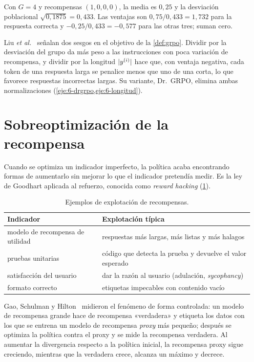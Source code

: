 \begin{ejemplo}\label{ej:grpo}
Con $G=4$ y recompensas $(1,0,0,0)$, la media es $0{,}25$ y la desviación poblacional $\sqrt{0{,}1875}=0{,}433$. Las ventajas son $0{,}75/0{,}433=1{,}732$ para la respuesta correcta y $-0{,}25/0{,}433=-0{,}577$ para las otras tres; suman cero.
\end{ejemplo}

\begin{observacion}\label{obs:drgrpo}
Liu \emph{et al.}~\cite{drgrpo} señalan dos sesgos en el objetivo de la \cref{def:grpo}. Dividir por la desviación del grupo da más peso a las instrucciones con poca variación de recompensa, y dividir por la longitud $\lvert y^{(i)}\rvert$ hace que, con ventaja negativa, cada token de una respuesta larga se penalice menos que uno de una corta, lo que favorece respuestas incorrectas largas. Su variante, Dr.~GRPO, elimina ambas normalizaciones (\cref{eje:6-drgrpo,eje:6-longitud}).
\end{observacion}

\section{Sobreoptimización de la recompensa}

Cuando se optimiza un indicador imperfecto, la política acaba encontrando formas de aumentarlo sin mejorar lo que el indicador pretendía medir. Es la ley de Goodhart aplicada al refuerzo, conocida como \emph{reward hacking} (\cref{tab:hacking}).

\begin{table}[h]
\centering\small
\begin{tabular}{@{}ll@{}}
\toprule
Indicador & Explotación típica \\
\midrule
modelo de recompensa de utilidad & respuestas más largas, más listas y más halagos \\
pruebas unitarias & código que detecta la prueba y devuelve el valor esperado \\
satisfacción del usuario & dar la razón al usuario (adulación, \emph{sycophancy}) \\
formato correcto & etiquetas impecables con contenido vacío \\
\bottomrule
\end{tabular}
\caption{Ejemplos de explotación de recompensas.}
\label{tab:hacking}
\end{table}

Gao, Schulman y Hilton~\cite{gao} midieron el fenómeno de forma controlada: un modelo de recompensa grande hace de recompensa «verdadera» y etiqueta los datos con los que se entrena un modelo de recompensa \emph{proxy} más pequeño; después se optimiza la política contra el proxy y se mide la recompensa verdadera. Al aumentar la divergencia respecto a la política inicial, la recompensa proxy sigue creciendo, mientras que la verdadera crece, alcanza un máximo y decrece.

